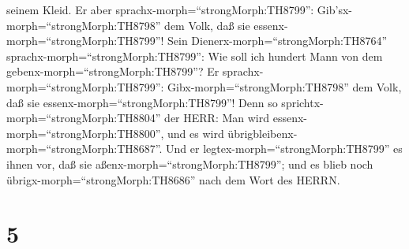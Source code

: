 seinem Kleid. Er aber sprachx-morph=``strongMorph:TH8799'':
Gib'sx-morph=``strongMorph:TH8798'' dem Volk, daß sie
essenx-morph=``strongMorph:TH8799''!  Sein
Dienerx-morph=``strongMorph:TH8764''
sprachx-morph=``strongMorph:TH8799'': Wie soll ich hundert Mann von dem
gebenx-morph=``strongMorph:TH8799''? Er
sprachx-morph=``strongMorph:TH8799'': Gibx-morph=``strongMorph:TH8798''
dem Volk, daß sie essenx-morph=``strongMorph:TH8799''! Denn so
sprichtx-morph=``strongMorph:TH8804'' der HERR: Man wird
essenx-morph=``strongMorph:TH8800'', und es wird
übrigbleibenx-morph=``strongMorph:TH8687''.  Und er
legtex-morph=``strongMorph:TH8799'' es ihnen vor, daß sie
aßenx-morph=``strongMorph:TH8799''; und es blieb noch
übrigx-morph=``strongMorph:TH8686'' nach dem Wort des HERRN.

\hypertarget{section-4}{%
\section{5}\label{section-4}}

